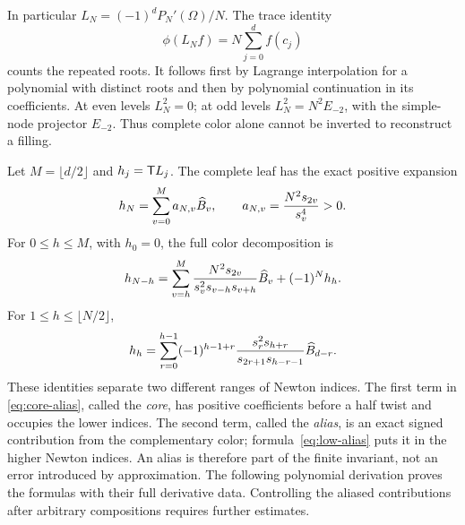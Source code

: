 In particular $L_N=(-1)^dP_N'(\Omega)/N$. The trace identity
\begin{equation}\label{eq:circle-trace}
 \phi(L_Nf)=N\sum_{j=0}^{d}f(c_j)
\end{equation}
counts the repeated roots. It follows first by Lagrange interpolation for a polynomial with distinct roots and then by polynomial continuation in its coefficients. At even levels $L_N^2=0$; at odd levels $L_N^2=N^2E_{-2}$, with the simple-node projector $E_{-2}$. Thus complete color alone cannot be inverted to reconstruct a filling.

Let $M=\lfloor d/2\rfloor$ and $h_j=\mathsf T L_j$. The complete leaf has the exact positive expansion
\begin{equation}\label{eq:complete-leaf}
 h_N=\sum_{v=0}^{M}a_{N,v}\widehat B_v,
 \qquad a_{N,v}=\frac{N^2s_{2v}}{s_v^4}>0.
\end{equation}
For $0\le h\le M$, with $h_0=0$, the full color decomposition is
\begin{equation}\label{eq:core-alias}
 h_{N-h}=\sum_{v=h}^{M}
 \frac{N^2s_{2v}}{s_v^2s_{v-h}s_{v+h}}\widehat B_v+(-1)^Nh_h.
\end{equation}
For $1\le h\le\lfloor N/2\rfloor$,
\begin{equation}\label{eq:low-alias}
 h_h=\sum_{r=0}^{h-1}(-1)^{h-1+r}
 \frac{s_r^2s_{h+r}}{s_{2r+1}s_{h-r-1}}\widehat B_{d-r}.
\end{equation}
These identities separate two different ranges of Newton indices. The first term in \eqref{eq:core-alias}, called the \emph{core}, has positive coefficients before a half twist and occupies the lower indices. The second term, called the \emph{alias}, is an exact signed contribution from the complementary color; formula~\eqref{eq:low-alias} puts it in the higher Newton indices. An alias is therefore part of the finite invariant, not an error introduced by approximation. The following polynomial derivation proves the formulas with their full derivative data. Controlling the aliased contributions after arbitrary compositions requires further estimates.

